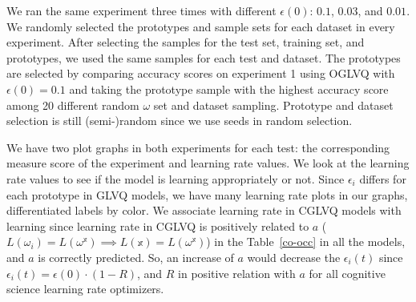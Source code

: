 We ran the same experiment three times with different $\epsilon(0)$: $0.1$, $0.03$, and $0.01$. We randomly selected the prototypes and sample sets for each dataset in every experiment. After selecting the samples for the test set, training set, and prototypes, we used the same samples for each test and dataset. The prototypes are selected by comparing accuracy scores on experiment 1 using OGLVQ with $\epsilon(0)= 0.1$ and taking the prototype sample with the highest accuracy score among 20 different random $\omega$ set and dataset sampling. Prototype and dataset selection is still (semi-)random since we use seeds in random selection.

We have two plot graphs in both experiments for each test: the corresponding measure score of the experiment and learning rate values. We look at the learning rate values to see if the model is learning appropriately or not. Since $\epsilon_{i}$ differs for each prototype in GLVQ models, we have many learning rate plots in our graphs, differentiated labels by color. We associate learning rate in CGLVQ models with learning since learning rate in CGLVQ is positively related to $a$ ($L(\omega_{i}) = L(\omega^{\mathbb{x}}) \implies L(\mathbb{x}) = L(\omega^{\mathbb{x}}) $) in the Table~\ref{co-occ} in all the models, and $a$ is correctly predicted. So, an increase of $a$ would decrease the $\epsilon_{i}(t)$ since $\epsilon_{i}(t) = \epsilon(0) \cdot (1-R)$, and $R$ in positive relation with $a$ for all cognitive science learning rate optimizers.
